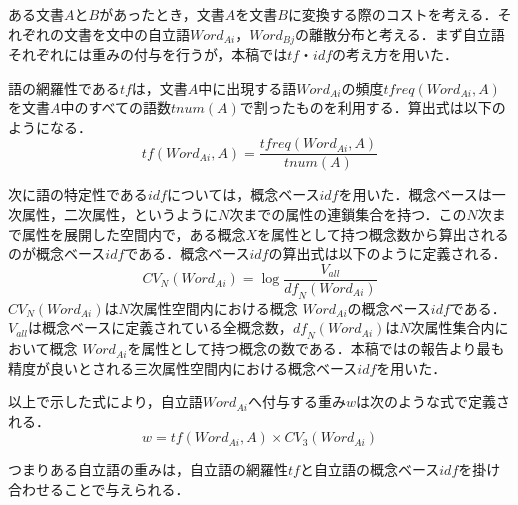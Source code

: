 \documentclass[japanese]{jnlp_1.4}
\begin{document}
ある文書$A$と$B$があったとき，文書$A$を文書$B$に変換する際のコストを考える．それぞれの文書を文中の自立語$\mathit{Word}_{Ai}，\mathit{Word}_{Bj}$の離散分布と考える．まず自立語それぞれには重みの付与を行うが，本稿では$tf・idf$の考え方を用いた．

語の網羅性である$tf$は，文書$A$中に出現する語$\mathit{Word}_{Ai}$の頻度$\mathit{tfreq}(\mathit{Word}_{Ai}, A)$を文書$A$中のすべての語数$\mathit{tnum}(A)$で割ったものを利用する．算出式は以下のようになる．
\begin{equation}
\mathit{tf}(\mathit{Word}_{Ai}, A)=\frac{\mathit{tfreq}(\mathit{Word}_{Ai}, A)}{\mathit{tnum}(A)}
\end{equation}

次に語の特定性である$idf$については，概念ベース$idf$\cite{Article_09}を用いた．概念ベースは一次属性，二次属性，というように$N$次までの属性の連鎖集合を持つ．この$N$次まで属性を展開した空間内で，ある概念$X$を属性として持つ概念数から算出されるのが概念ベース$idf$である．概念ベース$idf$の算出式は以下のように定義される．
\begin{equation}
 CV_N(\mathit{Word}_{Ai})=\log\frac{V_{\mathit{all}}}{\mathit{df}_N(\mathit{Word}_{Ai})}
\end{equation}
$CV_N(\mathit{Word}_{Ai})$は$N$次属性空間内における概念 $\mathit{Word}_{Ai} $の概念ベース$idf$である．$V_{\mathit{all}}$は概念ベースに定義されている全概念数，$\mathit{df}_N(\mathit{Word}_{Ai})$は$N$次属性集合内において概念 $\mathit{Word}_{Ai} $を属性として持つ概念の数である．本稿では\cite{Article_09}の報告より最も精度が良いとされる三次属性空間内における概念ベース$\mathit{idf}$を用いた．

以上で示した式により，自立語$\mathit{Word}_{Ai}$へ付与する重み$w$は次のような式で定義される．
\begin{equation}
w= \mathit{tf}(\mathit{Word}_{Ai}, A){\times} CV_3(\mathit{Word}_{Ai})
\end{equation}

つまりある自立語の重みは，自立語の網羅性$\mathit{tf}$と自立語の概念ベース$\mathit{idf}$を掛け合わせることで与えられる．
\end{document}
